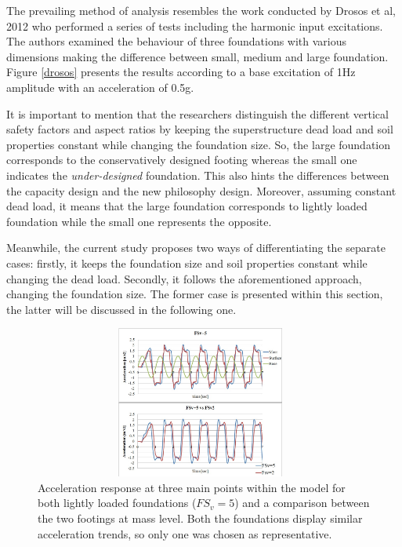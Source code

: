 The prevailing method of analysis resembles the work conducted by Drosos et al, 2012 \cite{drosos2012soil} who \mbox{performed} a series of tests including the harmonic input excitations. The authors \mbox{examined} the behaviour of three foundations with various dimensions making the \mbox{difference} between small, medium and large foundation. Figure \ref{drosos} presents the results according to a base excitation of 1Hz amplitude with an acceleration of 0.5g.

It is important to mention that the researchers distinguish the different vertical safety factors and aspect ratios by keeping the superstructure dead load and soil properties constant while changing the foundation size. So, the large foundation corresponds to the \mbox{conservatively} designed footing whereas the small one indicates the \textit{under-designed} foundation. This also hints the differences between the capacity design and the new \mbox{philosophy} design. Moreover, assuming constant dead load, it means that the large foundation corresponds to lightly loaded foundation while the small one represents the opposite. 

Meanwhile, the current study proposes two ways of differentiating the separate cases: firstly, it keeps the foundation size and soil properties constant while changing the dead load. \mbox{Secondly}, it follows the aforementioned approach, changing the foundation size. The former case is \mbox{presented} within this section, the latter will be discussed in the following one.

\begin{figure}[!h]
	\centering
	\includegraphics[width=11cm,height=5cm]{"acc_sin4m2"}
	\caption{Acceleration response at three main points within the model for both lightly loaded foundations ($FS_v=5$) and a comparison between the two footings at mass level. Both the foundations display similar acceleration trends, so only one was chosen as representative.}
	\label{acc4msin}
\end{figure}

